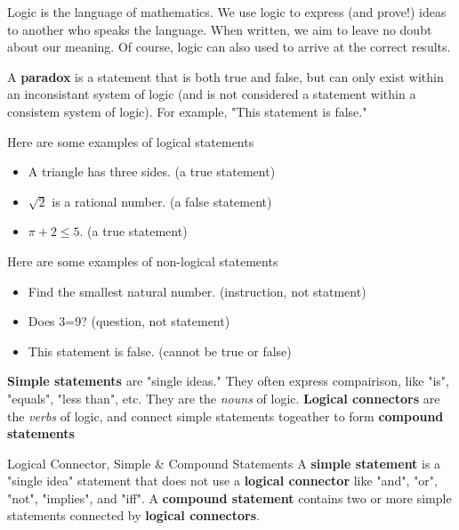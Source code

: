 Logic is the language of mathematics. We use logic to express (and prove!) ideas to another who speaks the language. When written, we aim to leave no doubt about our meaning. Of course, logic can also used to arrive at the correct results.

\begin{boxremark*}{}{}
	A {\bf paradox} is a statement that is both true and false, but can only exist within an inconsistant system of logic (and is not considered a statement within a consistem system of logic). For example, "This statement is false."
\end{boxremark*}

\begin{boxexample}{}{}
	Here are some examples of logical statements
	\begin{itemize}
		\item A triangle has three sides. (a true statement)
		\item $\sqrt 2$ is a rational number. (a false statement)
		\item $\pi + 2 \leq 5$. (a true statement)
	\end{itemize}
\end{boxexample}

\begin{boxexample}{}{}
	Here are some examples of non-logical statements
	\begin{itemize}
		\item Find the smallest natural number. (instruction, not statment)
		\item Does 3=9? (question, not statement)
		\item This statement is false. (cannot be true or false)
	\end{itemize}
\end{boxexample}

{\bf Simple statements} are "single ideas." They often express compairison, like "is", "equals", "less than", etc. They are the \emph{nouns} of logic. {\bf Logical connectors} are the \emph{verbs} of logic, and connect simple statements togeather to form {\bf compound statements}

\begin{boxdefine}{Logical Connector, Simple \& Compound Statements}{}
	A {\bf simple statement} is a "single idea" statement that does not use a {\bf logical connector} like "and", "or", "not", "implies", and "iff".
	A {\bf compound statement} contains two or more simple statements connected by {\bf logical connectors}.
\end{boxdefine}

